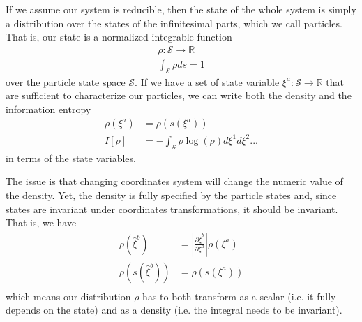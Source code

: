 \documentclass{ws-ijqi}
\begin{document}
If we assume our system is reducible, then the state of the whole system is simply a distribution over the states of the infinitesimal parts, which we call particles. That is, our state is a normalized integrable function
\begin{equation}
\begin{aligned}
	\rho : \mathcal{S} \to \mathbb{R} \\
	\int_{\mathcal{S}} \rho ds = 1
\end{aligned}
\end{equation}
over the particle state space $\mathcal{S}$. If we have a set of state variable $\xi^a : \mathcal{S} \to \mathbb{R}$ that are sufficient to characterize our particles, we can write both the density and the information entropy
\begin{equation}
\begin{aligned}
\rho(\xi^a) &= \rho(s(\xi^a)) \\
I[\rho] &= - \int_{\mathcal{S}} \rho \log (\rho) d\xi^1 d\xi^2 ...
\end{aligned}
\end{equation}
in terms of the state variables.

The issue is that changing coordinates system will change the numeric value of the density. Yet, the density is fully specified by the particle states and, since states are invariant under coordinates transformations, it should be invariant. That is, we have
\begin{equation}
\begin{aligned}
\rho(\hat{\xi}^b) &= \left| \frac{\partial \hat{\xi}^b}{\partial \xi^a} \right| \rho(\xi^a) \\
\rho(s(\hat{\xi}^b)) &= \rho(s(\xi^a)) \\
\end{aligned}
\end{equation}
which means our distribution $\rho$ has to both transform as a scalar (i.e. it fully depends on the state) and as a density (i.e. the integral needs to be invariant).
\end{document}
